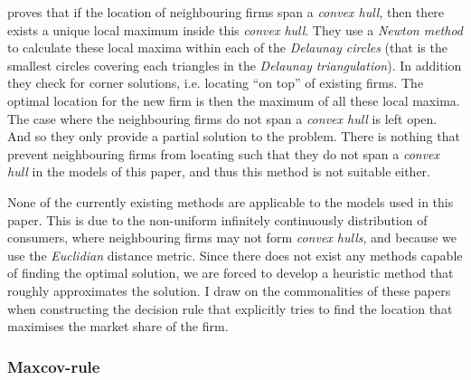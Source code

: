 \documentclass[preprint, 12pt]{elsarticle}
\begin{document}
\citet{Dehne_Klein_Seidel_2002} proves that if the location of neighbouring firms span a \emph{convex hull}, then there exists a unique local maximum inside this \emph{convex hull}. They use a \emph{Newton method} to calculate these local maxima within each of the \emph{Delaunay circles} (that is the smallest circles covering each triangles in the \emph{Delaunay triangulation}). In addition they check for corner solutions, i.e. locating ``on top'' of existing firms. The optimal location for the new firm is then the maximum of all these local maxima. The case where the neighbouring firms do not span a \emph{convex hull} is left open. And so they only provide a partial solution to the problem. There is nothing that prevent neighbouring firms from locating such that they do not span a \emph{convex hull} in the models of this paper, and thus this method is not suitable either. 

None of the currently existing methods are applicable to the models used in this paper. This is due to the non-uniform infinitely continuously distribution of consumers, where neighbouring firms may not form \emph{convex hulls}, and because we use the \emph{Euclidian} distance metric. Since there does not exist any methods capable of finding the optimal solution, we are forced to develop a heuristic method that roughly approximates the solution. I draw on the commonalities of these papers when constructing the decision rule that explicitly tries to find the location that maximises the market share of the firm.

\subsubsection{Maxcov-rule}
\end{document}
